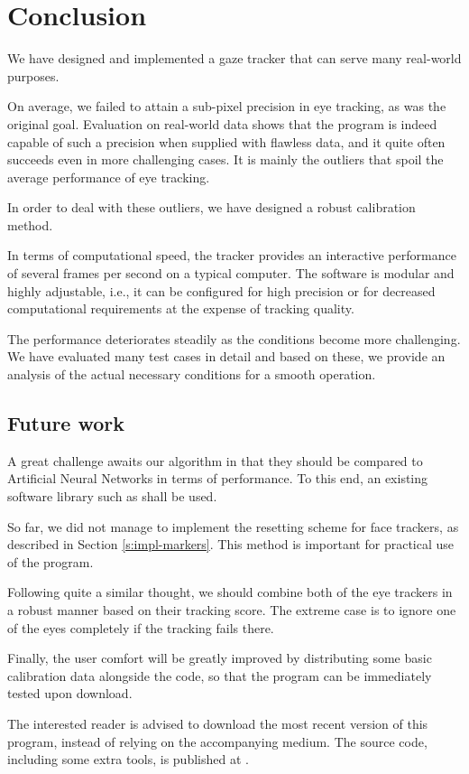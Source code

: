 \chapter*{Conclusion}

We have designed and implemented a gaze tracker that can serve many real-world purposes.

On average, we failed to attain a sub-pixel precision in eye tracking, as was the original goal.
Evaluation on real-world data shows that  the program is indeed capable of such a precision when supplied with flawless data, and it quite often succeeds even in more challenging cases.
It is mainly the outliers that spoil the average performance of eye tracking.

In order to deal with these outliers, we have designed a robust calibration method.

In terms of computational speed, the tracker provides an interactive performance of several frames per second on a typical computer.
The software is modular and highly adjustable, i.e., it can be configured for high precision or for decreased computational requirements at the expense of tracking quality.

The performance deteriorates steadily as the conditions become more challenging.
We have evaluated many test cases in detail and based on these, we provide an analysis of the actual necessary conditions for a smooth operation.

\section*{Future work}

A great challenge awaits our algorithm in that they should be compared to Artificial Neural Networks in terms of performance.
To this end, an existing software library such as \cite{deepgaze} shall be used.

So far, we did not manage to implement the resetting scheme for face trackers, as described in Section \ref{s:impl-markers}.
This method is important for practical use of the program.

Following quite a similar thought, we should combine both of the eye trackers in a robust manner based on their tracking score.
The extreme case is to ignore one of the eyes completely if the tracking fails there.

Finally, the user comfort will be greatly improved by distributing some basic calibration data alongside the code, so that the program can be immediately tested upon download.

The interested reader is advised to download the most recent version of this program, instead of relying on the accompanying medium.
The source code, including some extra tools, is published at .
